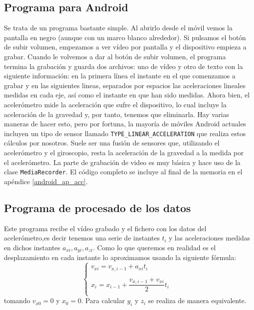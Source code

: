 \documentclass[a4paper,openright, 12pt]{book}
\begin{document}
\subsection{Programa para Android}
Se trata de un programa bastante simple. Al abrirlo desde el móvil vemos la pantalla en negro (aunque con un marco blanco alrededor). Si pulsamos el botón de subir volumen, empezamos a ver vídeo por pantalla y el dispositivo empieza a grabar. Cuando le volvemos a dar al botón de subir volumen, el programa termina la grabación y guarda dos archivos: uno de vídeo y otro de texto con la siguiente información: en la primera línea el instante en el que comenzamos a grabar y en las siguientes lineas, separados por espacios las aceleraciones lineales medidas en cada eje, así como el instante en que han sido medidas.
Ahora bien, el acelerómetro mide la aceleración que sufre el dispositivo, lo cual incluye la aceleración de la gravedad y, por tanto, tenemos que eliminarla. Hay varias maneras de hacer esto, pero por fortuna, la mayoría de móviles Android actuales incluyen un tipo de sensor llamado \lstinline|TYPE_LINEAR_ACCELERATION| que realiza estos cálculos por nosotros. Suele ser una fusión de sensores que, utilizando el acelerómetro y el giroscopio, resta la aceleración de la gravedad a la medida por el acelerómetro.
La parte de grabación de video es muy básica y hace uso de la clase \lstinline|MediaRecorder|.
El código completo se incluye al final de la memoria en el apéndice \ref{android_ap_acc}.
\newpage
\subsection{Programa de procesado de los datos}
Este programa recibe el vídeo grabado y el fichero con los datos del acelerómetro,es decir tenemos una serie de instantes $t_i$ y las aceleraciones medidas en dichos instantes $a_{xi}, a_{yi}, a_{zi}$.
Como lo que queremos en realidad es el desplazamiento en cada instante lo aproximamos usando la siguiente fórmula:
\begin{equation}
\left\{ \begin{array}{lcc}
             v_{xi} = v_{x,i-1} + a_{xi}t_i \\
             \\ x_i = x_{i-1} + \dfrac{v_{x,i-1} + v_{xi}}{2} t_i \\
             \end{array}
   \right.
\end{equation}
tomando $v_{x0}=0$ y $x_0=0$.
Para calcular $y_i$ y $z_i$ se realiza de manera equivalente.
\end{document}
